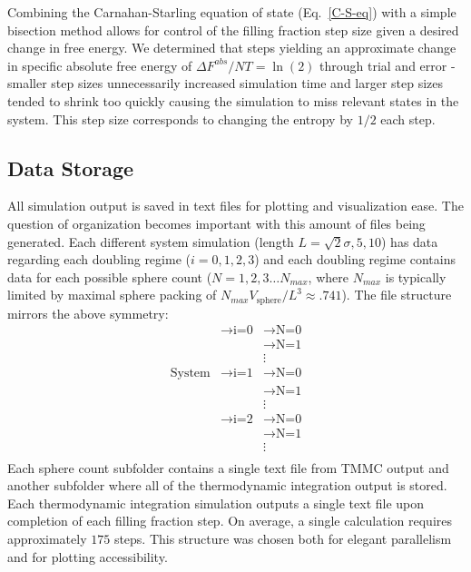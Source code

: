 \documentclass[12pt]{article}
\newcommand{\ignore}[1]{}
\begin{document}
Combining the Carnahan-Starling equation of state (Eq.~\ref{C-S-eq}) with a simple bisection method allows for control of the filling fraction step size given a desired change in free energy. We determined that steps yielding an approximate change in specific absolute free energy of $\Delta F^{abs}/NT = \ln(2)$ through trial and error - smaller step sizes unnecessarily increased simulation time and larger step sizes tended to shrink too quickly causing the simulation to miss relevant states in the system. This step size corresponds to changing the entropy by $1/2$ each step. 

\ignore{NB: is there a more physical reason we chose this filling fraction increase?}

\subsection{Data Storage}
All simulation output is saved in text files for plotting and visualization ease. The question of organization becomes important with this amount of files being generated. Each different system simulation (length $L = \sqrt2 \sigma, 5,10$) has data regarding each doubling regime ($i=0,1, 2, 3$) and each doubling regime contains data for each possible sphere count ($N=1, 2, 3\dots N_{max}$, where $N_{max}$ is typically limited by maximal sphere packing of $N_{max}V_{\text{sphere}}/L^3\approx.741$). The file structure mirrors the above symmetry: 
\begin{align*}
                &\rightarrow \text{i=0} &\rightarrow \text{N=0}\\
                & &\rightarrow \text{N=1}\\
                && \vdots\\
\text{System} & \rightarrow \text{i=1} &\rightarrow \text{N=0}\\
                && \rightarrow \text{N=1}\\
                &&\vdots\\
                &\rightarrow \text{i=2} &\rightarrow \text{N=0}\\
                && \rightarrow \text{N=1}\\
                &&\vdots\\
\end{align*}
Each sphere count subfolder contains a single text file from TMMC output and another subfolder where all of the thermodynamic integration output is stored. Each thermodynamic integration simulation outputs a single text file upon completion of each filling fraction step. On average, a single calculation requires approximately $175$ steps. This structure was chosen both for elegant parallelism and for plotting accessibility. 
\end{document}
